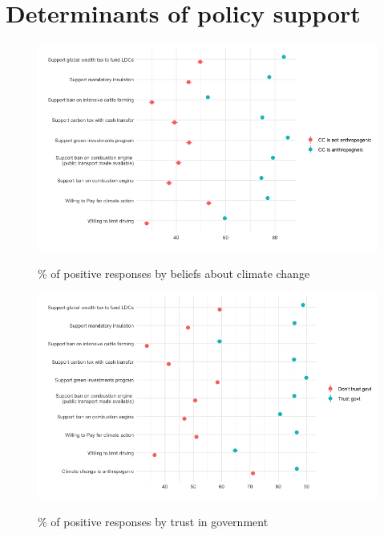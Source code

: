 	
\section{Determinants of policy support} %

\begin{frame}{}%
	\begin{figure}[h!]
	\caption{\% of positive responses by beliefs about climate change} %
	\includegraphics[width=.7\paperwidth]{../figures/country_comparison/main_var_by_country_anthropogenic_all.png} \\
	\end{figure}
\end{frame}
	
	\begin{frame}{}%
	\begin{figure}[h!]
	\caption{\% of positive responses by trust in government}
	\includegraphics[width=.7\paperwidth]{../figures/country_comparison/main_var_by_country_trust_govt_all.png} \\
	\end{figure}
	\end{frame}
	
